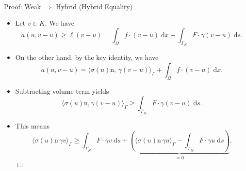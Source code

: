 \documentclass[10pt,aspectratio=169]{beamer}
\def\d{{\mathrm{d}}}
\def\dx{{\d x}}
\def\ds{{\d s}}
\def\eop{\hfill{$\Box$}}
\begin{document}
\begin{frame}{Proof: Weak $\Rightarrow$ Hybrid (Hybrid Equality)}
	\begin{itemize}
		\item Let $v\in K$. We have
		      \begin{equation*}
			      a(u,v-u)\ge\ell(v-u) = \int_\Omega f\cdot(v-u)\;\dx + \int_{\Gamma_N}F\cdot\gamma(v-u)\;\ds.
		      \end{equation*}
		\item On the other hand, by the key identity, we have
		      \begin{equation*}
			      a(u,v-u) = \langle \sigma(u)\mathrm{n},\,\gamma(v-u)\rangle_\Gamma + \int_\Omega f\cdot(v-u)\;\dx.
		      \end{equation*}
		\item Subtracting volume term yields
		      \begin{equation*}
			      \langle \sigma(u)\mathrm n,\gamma(v-u)\rangle_\Gamma
			      \ge
			      \int_{\Gamma_N}F\cdot\gamma(v-u)\;\ds.
		      \end{equation*}
		\item This means
		      \begin{equation*}
			      \langle\sigma(u)\mathrm{n}\,\gamma v\rangle_\Gamma\ge \int_{\Gamma_N}F\cdot \gamma v\;\ds + \underbrace{\left(\langle\sigma(u)\mathrm{n}\,\gamma u\rangle_\Gamma-\int_{\Gamma_N}F\cdot\gamma u\;\ds\right)}_{ = 0}.
		      \end{equation*}\eop
	\end{itemize}
\end{frame}
\end{document}
